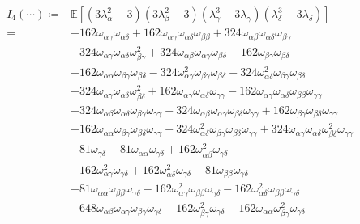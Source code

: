 \begin{equation*}\begin{split}
    I_4(\cdots) \coloneqq& \mathbb E\left[(3\lambda_\alpha^2-3)(3\lambda_\beta^2-3)(\lambda_\gamma^3-3\lambda_\gamma)(\lambda_\delta^3-3\lambda_\delta)\right] \\
    =& -162\omega_{\alpha\gamma}\omega_{\alpha\delta} + 162\omega_{\alpha\gamma}\omega_{\alpha\delta}\omega_{\beta\beta} + 324\omega_{\alpha\beta}\omega_{\alpha\delta}\omega_{\beta\gamma} \\
    & - 324\omega_{\alpha\gamma}\omega_{\alpha\delta}\omega_{\beta\gamma}^2 + 324\omega_{\alpha\beta}\omega_{\alpha\gamma}\omega_{\beta\delta} - 162\omega_{\beta\gamma}\omega_{\beta\delta} \\
    & + 162\omega_{\alpha\alpha}\omega_{\beta\gamma}\omega_{\beta\delta} - 324\omega_{\alpha\gamma}^2\omega_{\beta\gamma}\omega_{\beta\delta} - 324\omega_{\alpha\delta}^2\omega_{\beta\gamma}\omega_{\beta\delta} \\
    & - 324\omega_{\alpha\gamma}\omega_{\alpha\delta}\omega_{\beta\delta}^2 + 162\omega_{\alpha\gamma}\omega_{\alpha\delta}\omega_{\gamma\gamma} - 162\omega_{\alpha\gamma}\omega_{\alpha\delta}\omega_{\beta\beta}\omega_{\gamma\gamma} \\
    & - 324\omega_{\alpha\beta}\omega_{\alpha\delta}\omega_{\beta\gamma}\omega_{\gamma\gamma} - 324\omega_{\alpha\beta}\omega_{\alpha\gamma}\omega_{\beta\delta}\omega_{\gamma\gamma} + 162\omega_{\beta\gamma}\omega_{\beta\delta}\omega_{\gamma\gamma} \\
    & - 162\omega_{\alpha\alpha}\omega_{\beta\gamma}\omega_{\beta\delta}\omega_{\gamma\gamma} + 324\omega_{\alpha\delta}^2\omega_{\beta\gamma}\omega_{\beta\delta}\omega_{\gamma\gamma} + 324\omega_{\alpha\gamma}\omega_{\alpha\delta}\omega_{\beta\delta}^2\omega_{\gamma\gamma} \\
    & + 81\omega_{\gamma\delta} - 81\omega_{\alpha\alpha}\omega_{\gamma\delta} + 162\omega_{\alpha\beta}^2\omega_{\gamma\delta} \\
    & + 162\omega_{\alpha\gamma}^2\omega_{\gamma\delta} + 162\omega_{\alpha\delta}^2\omega_{\gamma\delta} - 81\omega_{\beta\beta}\omega_{\gamma\delta} \\
    & + 81\omega_{\alpha\alpha}\omega_{\beta\beta}\omega_{\gamma\delta} - 162\omega_{\alpha\gamma}^2\omega_{\beta\beta}\omega_{\gamma\delta} - 162\omega_{\alpha\delta}^2\omega_{\beta\beta}\omega_{\gamma\delta} \\
    & - 648\omega_{\alpha\beta}\omega_{\alpha\gamma}\omega_{\beta\gamma}\omega_{\gamma\delta} + 162\omega_{\beta\gamma}^2\omega_{\gamma\delta} - 162\omega_{\alpha\alpha}\omega_{\beta\gamma}^2\omega_{\gamma\delta} \\

\end{split}
\end{equation*}
